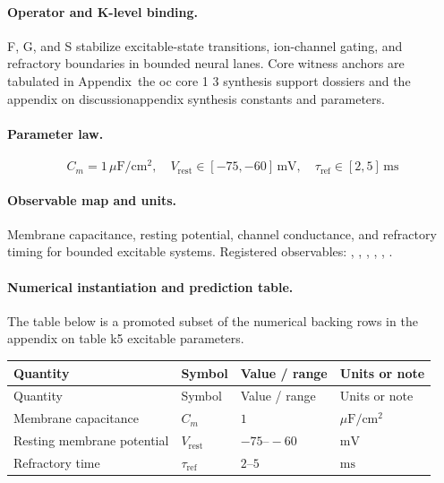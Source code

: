 \paragraph{Operator and K-level binding.}
F, G, and S stabilize excitable-state transitions, ion-channel gating, and refractory boundaries in bounded neural lanes.
Core witness anchors are tabulated in Appendix~the oc core 1 3 synthesis support dossiers and the appendix on discussionappendix synthesis constants and parameters.

\paragraph{Parameter law.}
\[
C_m = 1\,\mu\mathrm{F/cm^2},\quad V_{\mathrm{rest}} \in [-75,-60]\,\mathrm{mV},\quad \tau_{\mathrm{ref}} \in [2,5]\,\mathrm{ms}
\]

\paragraph{Observable map and units.}
Membrane capacitance, resting potential, channel conductance, and refractory timing for bounded excitable systems.
Registered observables: , \allowbreak {}, \allowbreak {}, \allowbreak {}, \allowbreak {}, \allowbreak {}.

\paragraph{Numerical instantiation and prediction table.}
The table below is a promoted subset of the numerical backing rows in the appendix on table k5 excitable parameters.
\begin{longtable}{@{}L{0.27\textwidth}L{0.15\textwidth}L{0.24\textwidth}L{0.16\textwidth}@{}}
\toprule
Quantity & Symbol & Value / range & Units or note \\
\midrule
\endfirsthead
\toprule
Quantity & Symbol & Value / range & Units or note \\
\midrule
\endhead
Membrane capacitance & $\scriptstyle C_m$ & $1$ & $\mu\mathrm{F/cm^2}$ \\
Resting membrane potential & $\scriptstyle V_{\mathrm{rest}}$ & $-75\text{--}-60$ & $\mathrm{mV}$ \\
Refractory time & $\scriptstyle \tau_{\mathrm{ref}}$ & $2\text{--}5$ & $\mathrm{ms}$ \\
\bottomrule
\end{longtable}

